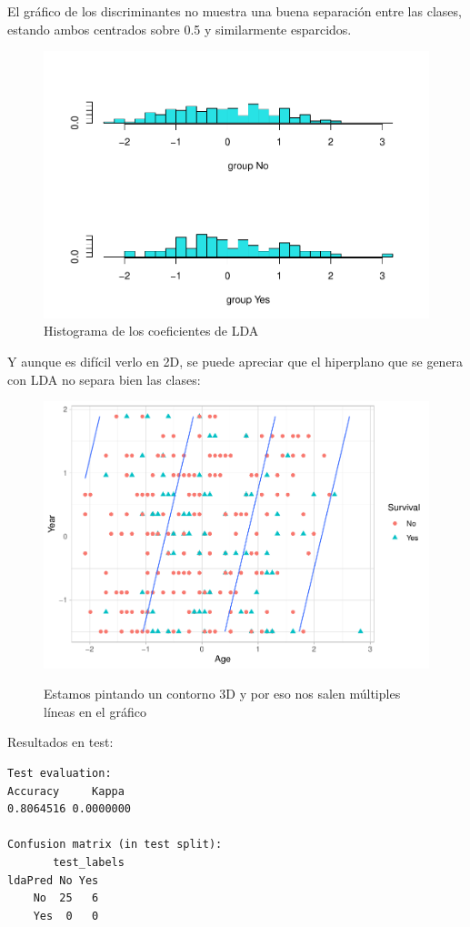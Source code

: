 El gráfico de los discriminantes no muestra una buena separación entre las clases, estando ambos centrados sobre 0.5 y similarmente esparcidos.
\begin{figure}[H]\center\includegraphics[width=.9\linewidth]{img/Clasificacion_files/figure-latex/unnamed-chunk-23-1}\caption{Histograma de los coeficientes de LDA}\end{figure}

Y aunque es difícil verlo en 2D, se puede apreciar que el hiperplano que se genera con LDA no separa bien las clases:
\begin{figure}[H]\center\includegraphics[width=.9\linewidth]{img/Clasificacion_files/figure-latex/unnamed-chunk-24-1}\caption{}\small{Estamos pintando un contorno 3D y por eso nos salen múltiples líneas en el gráfico}\end{figure}

\vspace{\baselineskip}

Resultados en test:
\begin{verbatim}
Test evaluation:
Accuracy     Kappa 
0.8064516 0.0000000

Confusion matrix (in test split):
       test_labels
ldaPred No Yes
    No  25   6
    Yes  0   0
\end{verbatim}

